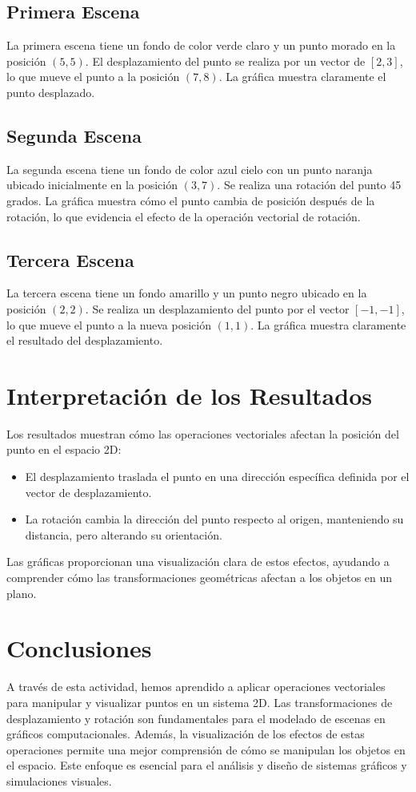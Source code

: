 \documentclass{article}
\begin{document}
\subsection{Primera Escena}
La primera escena tiene un fondo de color verde claro y un punto morado en la posición \((5,5)\). El desplazamiento del punto se realiza por un vector de \([2, 3]\), lo que mueve el punto a la posición \((7,8)\). La gráfica muestra claramente el punto desplazado.

\subsection{Segunda Escena}
La segunda escena tiene un fondo de color azul cielo con un punto naranja ubicado inicialmente en la posición \((3, 7)\). Se realiza una rotación del punto 45 grados. La gráfica muestra cómo el punto cambia de posición después de la rotación, lo que evidencia el efecto de la operación vectorial de rotación.

\subsection{Tercera Escena}
La tercera escena tiene un fondo amarillo y un punto negro ubicado en la posición \((2, 2)\). Se realiza un desplazamiento del punto por el vector \([-1, -1]\), lo que mueve el punto a la nueva posición \((1, 1)\). La gráfica muestra claramente el resultado del desplazamiento.

\section{Interpretación de los Resultados}
Los resultados muestran cómo las operaciones vectoriales afectan la posición del punto en el espacio 2D:
\begin{itemize}
    \item El desplazamiento traslada el punto en una dirección específica definida por el vector de desplazamiento.
    \item La rotación cambia la dirección del punto respecto al origen, manteniendo su distancia, pero alterando su orientación.
\end{itemize}

Las gráficas proporcionan una visualización clara de estos efectos, ayudando a comprender cómo las transformaciones geométricas afectan a los objetos en un plano.

\section{Conclusiones}
A través de esta actividad, hemos aprendido a aplicar operaciones vectoriales para manipular y visualizar puntos en un sistema 2D. Las transformaciones de desplazamiento y rotación son fundamentales para el modelado de escenas en gráficos computacionales. Además, la visualización de los efectos de estas operaciones permite una mejor comprensión de cómo se manipulan los objetos en el espacio. Este enfoque es esencial para el análisis y diseño de sistemas gráficos y simulaciones visuales.
\end{document}
